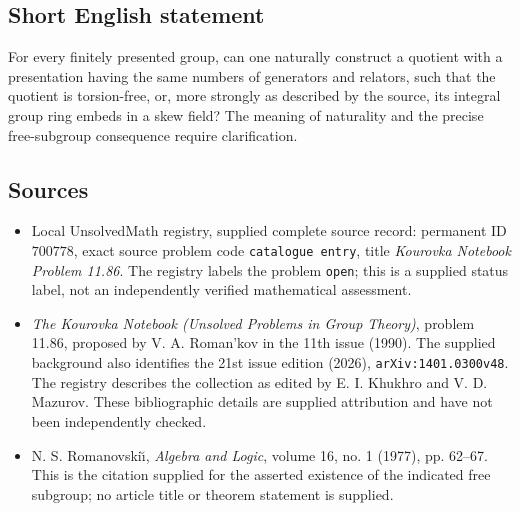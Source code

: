 \documentclass[11pt]{article}
\begin{document}
\subsection{Short English statement}
For every finitely presented group, can one naturally construct a quotient with a presentation having the same numbers of generators and relators, such that the quotient is torsion-free, or, more strongly as described by the source, its integral group ring embeds in a skew field? The meaning of naturality and the precise free-subgroup consequence require clarification.
\subsection{Sources}
\begin{itemize}
\item Local UnsolvedMath registry, supplied complete source record: permanent ID \(700778\), exact source problem code \texttt{catalogue entry}, title \emph{Kourovka Notebook Problem 11.86}. The registry labels the problem \texttt{open}; this is a supplied status label, not an independently verified mathematical assessment.
\item \emph{The Kourovka Notebook (Unsolved Problems in Group Theory)}, problem 11.86, proposed by V. A. Roman'kov in the 11th issue (1990). The supplied background also identifies the 21st issue edition (2026), \texttt{arXiv:1401.0300v48}. The registry describes the collection as edited by E. I. Khukhro and V. D. Mazurov. These bibliographic details are supplied attribution and have not been independently checked.
\item N. S. Romanovski\u{\i}, \emph{Algebra and Logic}, volume 16, no. 1 (1977), pp. 62--67. This is the citation supplied for the asserted existence of the indicated free subgroup; no article title or theorem statement is supplied.
\end{itemize}
\end{document}
